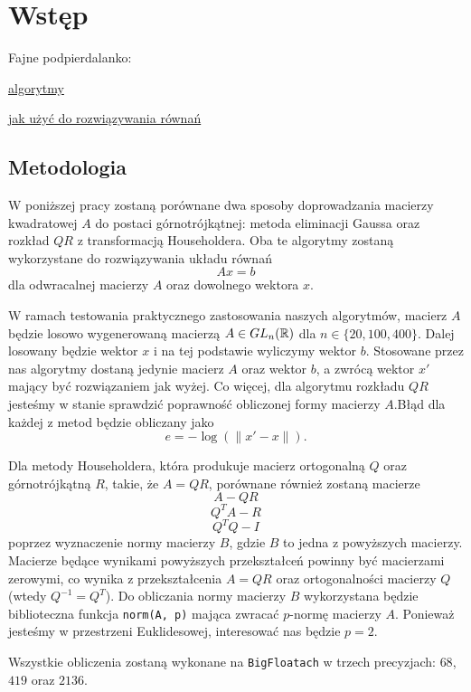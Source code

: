 \section{Wstęp}

Fajne podpierdalanko:

\href{https://people.inf.ethz.ch/gander/papers/qrneu.pdf}{algorytmy}

\href{https://inst.eecs.berkeley.edu/~ee127/sp21/livebook/l_lineqs_solving.html}{jak użyć do rozwiązywania równań}

\subsection{Metodologia}

W poniższej pracy zostaną porównane dwa sposoby doprowadzania macierzy kwadratowej $A$ do postaci górnotrójkątnej: metoda eliminacji Gaussa oraz rozkład $QR$ z transformacją Householdera. Oba te algorytmy zostaną wykorzystane do rozwiązywania układu równań 
$$Ax=b$$
dla odwracalnej macierzy $A$ oraz dowolnego wektora $x$.

W ramach testowania praktycznego zastosowania naszych algorytmów, macierz $A$ będzie losowo wygenerowaną macierzą $A\in GL_n(\mathbb{R})$ dla $n\in\{20,100,400\}$. Dalej losowany będzie wektor $x$ i na tej podstawie wyliczymy wektor $b$. Stosowane przez nas algorytmy dostaną jedynie macierz $A$ oraz wektor $b$, a zwrócą wektor $x'$ mający być rozwiązaniem jak wyżej. Co więcej, dla algorytmu rozkładu $QR$ jesteśmy w stanie sprawdzić poprawność obliczonej formy macierzy $A$.Błąd dla każdej z metod będzie obliczany jako
$$e=-\log(\|x'-x\|).$$

Dla metody Householdera, która produkuje macierz ortogonalną $Q$ oraz górnotrójkątną $R$, takie, że $A=QR$, porównane również zostaną macierze
$$A-QR$$
$$Q^TA-R$$
$$Q^TQ-I$$
poprzez wyznaczenie normy macierzy $B$, gdzie $B$ to jedna z powyższych macierzy. Macierze będące wynikami powyższych przekształceń powinny być macierzami zerowymi, co wynika z przekształcenia $A=QR$ oraz ortogonalności macierzy $Q$ (wtedy $Q^{-1}=Q^T$). Do obliczania normy macierzy $B$ wykorzystana będzie biblioteczna funkcja \verb+norm(A, p)+ mająca zwracać $p$-normę macierzy $A$. Ponieważ jesteśmy w przestrzeni Euklidesowej, interesować nas będzie $p=2$. 

Wszystkie obliczenia zostaną wykonane na \verb+BigFloatach+ w trzech precyzjach: $68$, $419$ oraz $2136$.